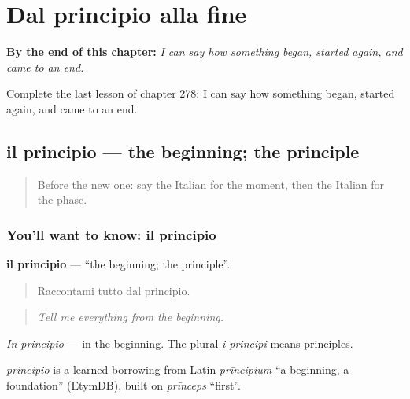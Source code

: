 
\chapter{Dal principio alla fine}
\label{ch:it-dal-principio-alla-fine}

\begin{chapteropening}
\textbf{By the end of this chapter:} \emph{I can say how something began, started again, and came to an end.}

Complete the last lesson of chapter 278: I can say how something began, started again, and came to an end.
\end{chapteropening}

\section[il principio]{il principio — the beginning; the principle}

\label{lesson:IT-C278-principio}



\begin{quote}
Before the new one: say the Italian for the moment, then the Italian for the phase.
\end{quote}

\subsection*{You'll want to know: il principio}
\textbf{il principio} — \textquotedblleft{}the beginning; the principle\textquotedblright{}.

\begin{quote}
Raccontami tutto dal principio.
\end{quote}

\begin{quote}
\emph{Tell me everything from the beginning.}
\end{quote}

\emph{In principio} — in the beginning. The plural \emph{i principi} means principles.

\begin{cousinweb}
\emph{principio} is a learned borrowing from Latin \emph{prīncipium} \textquotedblleft{}a beginning, a foundation\textquotedblright{} (EtymDB), built on \emph{prīnceps} \textquotedblleft{}first\textquotedblright{}.
\end{cousinweb}

